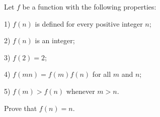 Let $f$ be a function with the following properties:

1) $f(n)$ is defined for every positive integer $n$;

2) $f(n)$ is an integer;

3) $f(2)=2$;

4) $f(mn)=f(m)f(n)$ for all $m$ and $n$;

5) $f(m)>f(n)$ whenever $m>n$.

Prove that $f(n)=n$.